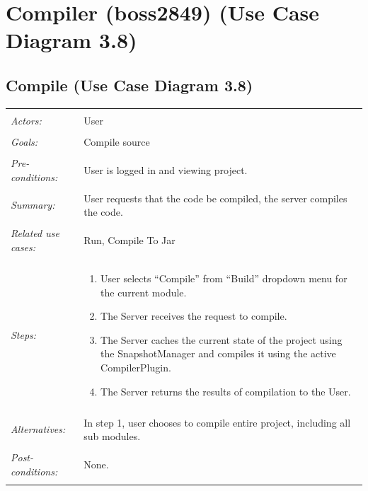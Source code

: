\documentclass[11pt]{report}
\begin{document}
\section{Compiler (boss2849) (Use Case Diagram 3.8) }
\subsection{Compile (Use Case Diagram 3.8)}
\begin{tabular}{ p{2cm} p{12cm} }
    \hline
    \\
    \textit{Actors:} & User \\ 
    \\
    \textit{Goals:} & Compile source \\
    \\
    \textit{Pre-conditions:} & User is logged in and viewing project. \\
    \\
    \textit{Summary:} & User requests that the code be compiled, the server compiles the code. \\
    \\
    \textit{Related use cases:} & Run, Compile To Jar \\ 
    \\
    \textit{Steps:} & \begin{enumerate}
        \item User selects ``Compile'' from ``Build'' dropdown menu for the current module.
        \item The Server receives the request to compile.
        \item The Server caches the current state of the project using the SnapshotManager and compiles it using the active CompilerPlugin.
        \item The Server returns the results of compilation to the User.
    \end{enumerate} \\
    \\
    \textit{Alternatives:} & In step 1, user chooses to compile entire project, including all sub modules. \\
    \\
    \textit{Post-conditions:} & None. \\
    \\
    \hline
\end{tabular}
\end{document}
